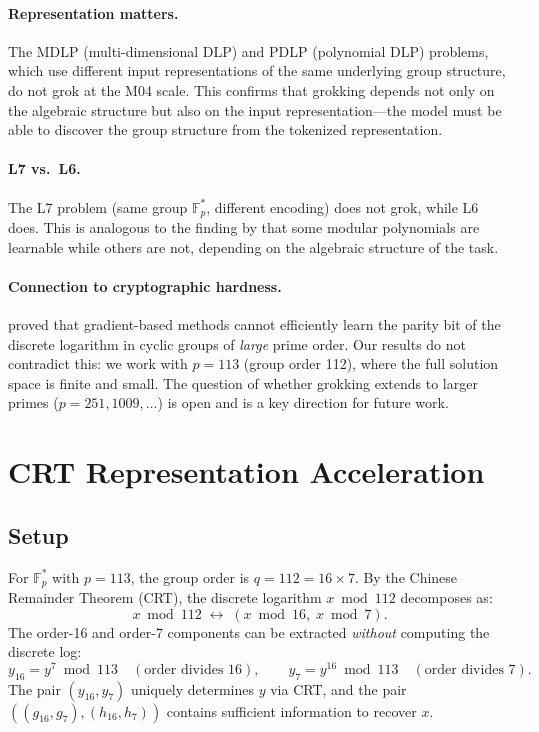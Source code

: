 \documentclass[11pt]{article}
\newcommand{\Fps}{\mathbb{F}_p^*}
\begin{document}
\paragraph{Representation matters.} The MDLP (multi-dimensional DLP) and PDLP (polynomial DLP) problems, which use different input representations of the same underlying group structure, do not grok at the M04 scale. This confirms that grokking depends not only on the algebraic structure but also on the input representation---the model must be able to discover the group structure from the tokenized representation.

\paragraph{L7 vs.~L6.} The L7 problem (same group $\Fps$, different encoding) does not grok, while L6 does. This is analogous to the finding by \citet{furuta2024grokking} that some modular polynomials are learnable while others are not, depending on the algebraic structure of the task.

\paragraph{Connection to cryptographic hardness.} \citet{takhanov2024intractability} proved that gradient-based methods cannot efficiently learn the parity bit of the discrete logarithm in cyclic groups of \emph{large} prime order. Our results do not contradict this: we work with $p = 113$ (group order 112), where the full solution space is finite and small. The question of whether grokking extends to larger primes ($p = 251, 1009, \ldots$) is open and is a key direction for future work.



\section{CRT Representation Acceleration}
\label{sec:crt}

\subsection{Setup}

For $\Fps$ with $p = 113$, the group order is $q = 112 = 16 \times 7$. By the Chinese Remainder Theorem (CRT), the discrete logarithm $x \bmod 112$ decomposes as:
\begin{equation}
    x \bmod 112 \;\longleftrightarrow\; (x \bmod 16,\; x \bmod 7).
\end{equation}
The order-16 and order-7 components can be extracted \emph{without} computing the discrete log:
\begin{equation}
    y_{16} = y^7 \bmod 113 \quad (\text{order divides 16}), \qquad
    y_7 = y^{16} \bmod 113 \quad (\text{order divides 7}).
\end{equation}
The pair $(y_{16}, y_7)$ uniquely determines $y$ via CRT, and the pair $((g_{16}, g_7), (h_{16}, h_7))$ contains sufficient information to recover $x$.
\end{document}
